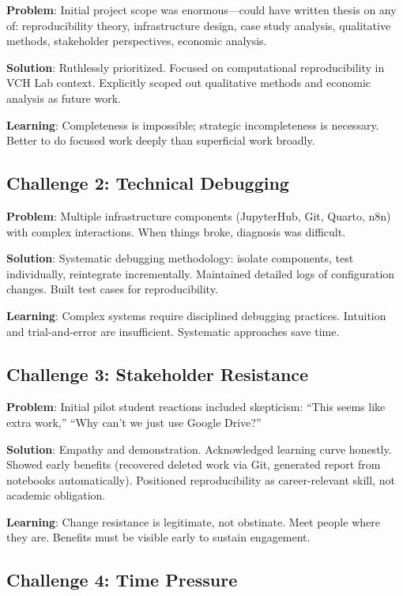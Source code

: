 \documentclass[
  oneside,
  open=any]{scrbook}
\begin{document}
\textbf{Problem}: Initial project scope was enormous---could have
written thesis on any of: reproducibility theory, infrastructure design,
case study analysis, qualitative methods, stakeholder perspectives,
economic analysis.

\textbf{Solution}: Ruthlessly prioritized. Focused on computational
reproducibility in VCH Lab context. Explicitly scoped out qualitative
methods and economic analysis as future work.

\textbf{Learning}: Completeness is impossible; strategic incompleteness
is necessary. Better to do focused work deeply than superficial work
broadly.

\subsection{Challenge 2: Technical
Debugging}\label{challenge-2-technical-debugging}

\textbf{Problem}: Multiple infrastructure components (JupyterHub, Git,
Quarto, n8n) with complex interactions. When things broke, diagnosis was
difficult.

\textbf{Solution}: Systematic debugging methodology: isolate components,
test individually, reintegrate incrementally. Maintained detailed logs
of configuration changes. Built test cases for reproducibility.

\textbf{Learning}: Complex systems require disciplined debugging
practices. Intuition and trial-and-error are insufficient. Systematic
approaches save time.

\subsection{Challenge 3: Stakeholder
Resistance}\label{challenge-3-stakeholder-resistance}

\textbf{Problem}: Initial pilot student reactions included skepticism:
``This seems like extra work,'' ``Why can't we just use Google Drive?''

\textbf{Solution}: Empathy and demonstration. Acknowledged learning
curve honestly. Showed early benefits (recovered deleted work via Git,
generated report from notebooks automatically). Positioned
reproducibility as career-relevant skill, not academic obligation.

\textbf{Learning}: Change resistance is legitimate, not obstinate. Meet
people where they are. Benefits must be visible early to sustain
engagement.

\subsection{Challenge 4: Time Pressure}\label{challenge-4-time-pressure}
\end{document}
